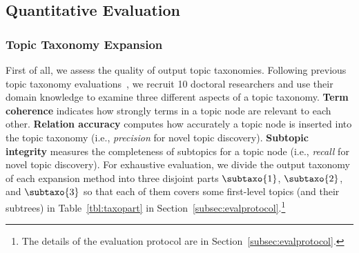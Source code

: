 


\subsection{Quantitative Evaluation}
\subsubsection{Topic Taxonomy Expansion}
\label{subsubsec:humaneval1}
First of all, we assess the quality of output topic taxonomies.
Following previous topic taxonomy evaluations~\cite{huang2020corel, lee2022taxocom}, we recruit 10 doctoral researchers and use their domain knowledge to examine three different aspects of a topic taxonomy.
\textbf{Term coherence} indicates how strongly terms in a topic node are relevant to each other. 
\textbf{Relation accuracy} computes how accurately a topic node is inserted into the topic taxonomy (i.e., \textit{precision} for novel topic discovery).
\textbf{Subtopic integrity} measures the completeness of subtopics for a topic node (i.e., \textit{recall} for novel topic discovery).
For exhaustive evaluation, we divide the output taxonomy of each expansion method into three disjoint parts $\subtaxo{1}$, $\subtaxo{2}$, and $\subtaxo{3}$ so that each of them covers some first-level topics (and their subtrees) in Table~\ref{tbl:taxopart} in Section~\ref{subsec:evalprotocol}.\footnote{The details of the evaluation protocol are in Section~\ref{subsec:evalprotocol}.}

